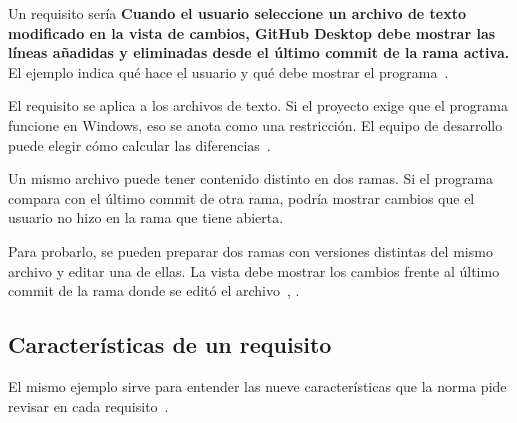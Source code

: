 \documentclass[11pt,a4paper]{article}
\begin{document}
Un requisito sería \textbf{Cuando el usuario seleccione un archivo de texto
modificado en la vista de cambios, GitHub Desktop debe mostrar las líneas
añadidas y eliminadas desde el último commit de la rama activa.} El ejemplo
indica qué hace el usuario y qué debe mostrar el programa~\cite[Sec. 5.2.4]{iso29148}.

El requisito se aplica a los archivos de texto. Si el proyecto exige que el
programa funcione en Windows, eso se anota como una restricción. El equipo
de desarrollo puede elegir cómo calcular las diferencias~\cite[Sec. 5.2.4]{iso29148}.

Un mismo archivo puede tener contenido distinto en dos ramas. Si el programa
compara con el último commit de otra rama, podría mostrar cambios que el
usuario no hizo en la rama que tiene abierta.

Para probarlo, se pueden preparar dos ramas con versiones distintas del
mismo archivo y editar una de ellas. La vista debe mostrar los cambios
frente al último commit de la rama donde se editó el archivo~\cite[Sec. 5.2.3]{iso29148}, \cite[Sec. 5.2.4]{iso29148}.

\subsection*{Características de un requisito}

El mismo ejemplo sirve para entender las nueve características que la norma
pide revisar en cada requisito~\cite[Sec. 5.2.5]{iso29148}.
\end{document}
